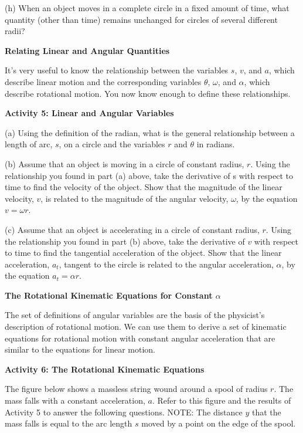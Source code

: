 (h) When an object moves in a complete circle in a fixed amount of time, what
quantity (other than time) remains unchanged for circles of several different
radii? 
\vspace{10mm}

\textbf{Relating Linear and Angular Quantities} 

It's very useful to know the relationship between the variables 
$s$, $v$, and $a$,
which describe linear motion and the corresponding variables \( \theta  \),
\( \omega  \), and \( \alpha  \), which describe rotational motion. You now
know enough to define these relationships.

\textbf{Activity 5: Linear and Angular Variables }

(a) Using the definition of the radian, what is the general relationship between
a length of arc, $s$, on a circle and the variables 
$r$ and \( \theta  \) in radians. 
\vspace{10mm}

(b) Assume that an object is moving in a circle of constant radius, $r$. Using the relationship you found in part (a) above, take the derivative of s with respect to time to find the velocity of the object. Show that the magnitude of the linear velocity, $v$, is related to the magnitude of the angular velocity,
\( \omega  \), by the equation \(v =  \omega r \).
\vspace{20mm}

(c) Assume that an object is accelerating in a circle of constant radius, $r$.
Using the relationship you found in part (b) above, take the derivative of $v$ with respect to time to find the tangential acceleration of the object. Show that the linear acceleration, \( a_{t} \), tangent to the circle is related to the angular acceleration, \( \alpha  \), by the equation \( a_{t}  =  \alpha  r\).
\vspace{20mm}

\textbf{The Rotational Kinematic Equations for Constant \( \alpha  \) }

The set of definitions of angular variables are the basis of the physicist's
description of rotational motion. We can use them to derive a set of kinematic
equations for rotational motion with constant angular acceleration that are
similar to the equations for linear motion. 

\newpage
\textbf{Activity 6: The Rotational Kinematic Equations }

The figure below shows a massless string wound around a spool of radius $r$.
The mass falls with a constant acceleration, $a$. Refer to this figure and the 
results of Activity 5 to answer the following questions. NOTE: The distance 
$y$ that the mass falls is equal to the arc length $s$ moved by a point on the 
edge of the spool.

